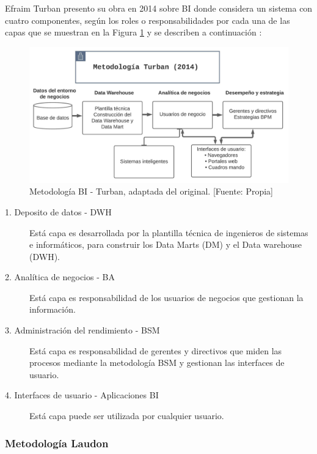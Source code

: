 \documentclass[11pt,titlepage]{report}
\begin{document}
Efraim Turban presento su obra en 2014 sobre BI donde considera un sistema con cuatro componentes, según los roles o responsabilidades por cada una de las capas que se muestran en la Figura \ref{fig: metTurban} y se describen a continuación \cite{lib02}:

\begin{figure}[h]
	\centering
	\includegraphics[width=1\linewidth]{Figuras/Met_Turban}
	\caption{Metodología BI - Turban, adaptada del original. [Fuente: Propia]}
	\label{fig: metTurban}
\end{figure}

\begin{description}
\item[1. Deposito de datos - DWH]
Está capa es desarrollada por la plantilla técnica de ingenieros de sistemas e informáticos, para construir los Data Marts (DM) y el Data warehouse (DWH).

\item[2. Analítica de negocios - BA]
Está capa es responsabilidad de los usuarios de negocios que gestionan la información.

\item[3. Administración del rendimiento - BSM]
Está capa es responsabilidad de gerentes y directivos que miden las procesos mediante la metodología BSM y gestionan las interfaces de usuario.

\item[4. Interfaces de usuario - Aplicaciones BI]
Está capa puede ser utilizada por cualquier usuario.\\
\end{description}


\subsubsection{Metodología Laudon}
\end{document}
